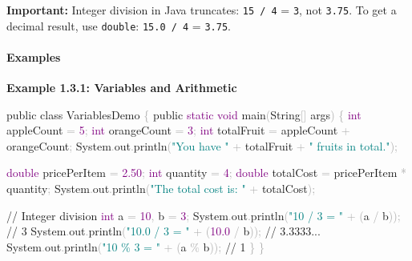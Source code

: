 \documentclass[
  justified,
  openright,
]{tufte-book}
\let\subsubsection\paragraph
\let\paragraph\paragraph
\newcommand{\BuiltInTok}[1]{#1}
\newcommand{\CommentTok}[1]{\textcolor{MidGray}{#1}}
\newcommand{\DataTypeTok}[1]{\textcolor{Purple}{#1}}
\newcommand{\DecValTok}[1]{\textcolor{Purple}{#1}}
\newcommand{\FloatTok}[1]{\textcolor{Purple}{#1}}
\newcommand{\FunctionTok}[1]{\textcolor{BrandBlue}{#1}}
\newcommand{\KeywordTok}[1]{\textcolor{BrandBlue}{#1}}
\newcommand{\NormalTok}[1]{#1}
\newcommand{\OperatorTok}[1]{\textcolor{DarkGray}{#1}}
\newcommand{\StringTok}[1]{\textcolor{Teal}{#1}}
\newenvironment{Shaded}{%
  \begin{snugshade}
}{%
  \end{snugshade}
}
\let\subsubsection\paragraph
\let\paragraph\paragraph
\begin{document}
\textbf{Important:} Integer division in Java truncates:
\texttt{15\ /\ 4} = \texttt{3}, not \texttt{3.75}. To get a decimal
result, use \texttt{double}: \texttt{15.0\ /\ 4} = \texttt{3.75}.

\subsubsection{Examples}\label{examples-1}

\textbf{Example 1.3.1: Variables and Arithmetic}

\begin{Shaded}
\begin{Highlighting}[]
\KeywordTok{public} \KeywordTok{class}\NormalTok{ VariablesDemo }\OperatorTok{\{}
    \KeywordTok{public} \DataTypeTok{static} \DataTypeTok{void} \FunctionTok{main}\OperatorTok{(}\BuiltInTok{String}\OperatorTok{[]}\NormalTok{ args}\OperatorTok{)} \OperatorTok{\{}
        \DataTypeTok{int}\NormalTok{ appleCount }\OperatorTok{=} \DecValTok{5}\OperatorTok{;}
        \DataTypeTok{int}\NormalTok{ orangeCount }\OperatorTok{=} \DecValTok{3}\OperatorTok{;}
        \DataTypeTok{int}\NormalTok{ totalFruit }\OperatorTok{=}\NormalTok{ appleCount }\OperatorTok{+}\NormalTok{ orangeCount}\OperatorTok{;}
        \BuiltInTok{System}\OperatorTok{.}\FunctionTok{out}\OperatorTok{.}\FunctionTok{println}\OperatorTok{(}\StringTok{"You have "} \OperatorTok{+}\NormalTok{ totalFruit }\OperatorTok{+} \StringTok{" fruits in total."}\OperatorTok{);}

        \DataTypeTok{double}\NormalTok{ pricePerItem }\OperatorTok{=} \FloatTok{2.50}\OperatorTok{;}
        \DataTypeTok{int}\NormalTok{ quantity }\OperatorTok{=} \DecValTok{4}\OperatorTok{;}
        \DataTypeTok{double}\NormalTok{ totalCost }\OperatorTok{=}\NormalTok{ pricePerItem }\OperatorTok{*}\NormalTok{ quantity}\OperatorTok{;}
        \BuiltInTok{System}\OperatorTok{.}\FunctionTok{out}\OperatorTok{.}\FunctionTok{println}\OperatorTok{(}\StringTok{"The total cost is: "} \OperatorTok{+}\NormalTok{ totalCost}\OperatorTok{);}

        \CommentTok{// Integer division}
        \DataTypeTok{int}\NormalTok{ a }\OperatorTok{=} \DecValTok{10}\OperatorTok{,}\NormalTok{ b }\OperatorTok{=} \DecValTok{3}\OperatorTok{;}
        \BuiltInTok{System}\OperatorTok{.}\FunctionTok{out}\OperatorTok{.}\FunctionTok{println}\OperatorTok{(}\StringTok{"10 / 3 = "} \OperatorTok{+} \OperatorTok{(}\NormalTok{a }\OperatorTok{/}\NormalTok{ b}\OperatorTok{));}       \CommentTok{// 3}
        \BuiltInTok{System}\OperatorTok{.}\FunctionTok{out}\OperatorTok{.}\FunctionTok{println}\OperatorTok{(}\StringTok{"10.0 / 3 = "} \OperatorTok{+} \OperatorTok{(}\FloatTok{10.0} \OperatorTok{/}\NormalTok{ b}\OperatorTok{));}  \CommentTok{// 3.3333...}
        \BuiltInTok{System}\OperatorTok{.}\FunctionTok{out}\OperatorTok{.}\FunctionTok{println}\OperatorTok{(}\StringTok{"10 \% 3 = "} \OperatorTok{+} \OperatorTok{(}\NormalTok{a }\OperatorTok{\%}\NormalTok{ b}\OperatorTok{));}        \CommentTok{// 1}
    \OperatorTok{\}}
\OperatorTok{\}}
\end{Highlighting}
\end{Shaded}
\end{document}
